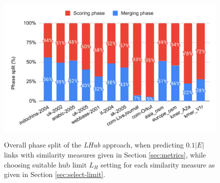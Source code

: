 \begin{figure}[hbtp]
  \centering
  \includegraphics[width=0.98\linewidth]{out/phase-split.pdf} \\[-2ex]
  \caption{Overall phase split of the \textit{LHub} approach, when predicting $0.1|E|$ links with similarity measures given in Section \ref{sec:metrics}, while choosing suitable hub limit $L_H$ setting for each similarity measure as given in Section \ref{sec:select-limit}.}
  \label{fig:phase-split}
\end{figure}
